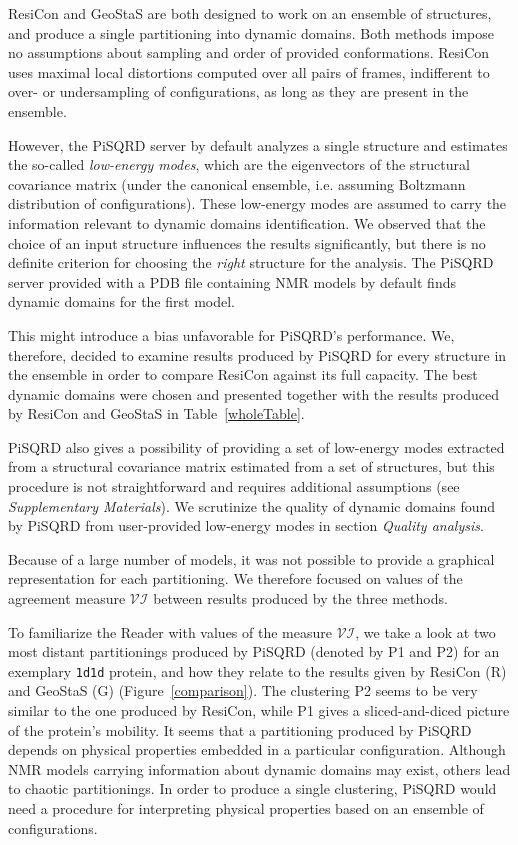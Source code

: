 \documentclass[a4paper,11pt,twoside]{book}%
\begin{document}
ResiCon and GeoStaS are both designed to work on an ensemble of structures, and produce a single partitioning into dynamic domains.
Both methods impose no assumptions about sampling and order of provided conformations.
ResiCon uses maximal local distortions computed over all pairs of frames, indifferent to over- or undersampling of configurations, as long as they are present in the ensemble.

However, the PiSQRD server by default analyzes a single structure and estimates the so-called \emph{low-energy modes}, which are the eigenvectors of the structural covariance matrix (under the canonical ensemble, i.e. assuming Boltzmann distribution of configurations).
These low-energy modes are assumed to carry the information relevant to dynamic domains identification.
We observed that the choice of an input structure influences the results significantly, but there is no definite criterion for choosing the \emph{right} structure for the analysis.
The PiSQRD server provided with a PDB file containing NMR models by default finds dynamic domains for the first model.

This might introduce a bias unfavorable for PiSQRD's performance. 
We, therefore, decided to examine results produced by PiSQRD for every structure in the ensemble in order to compare ResiCon against its full capacity.
The best dynamic domains were chosen and presented together with the results produced by ResiCon and GeoStaS in Table~\ref{wholeTable}.

PiSQRD also gives a possibility of providing a set of low-energy modes extracted from a structural covariance matrix estimated from a set of structures, but this procedure is not straightforward and requires additional assumptions (see \emph{Supplementary Materials}).
We scrutinize the quality of dynamic domains found by PiSQRD from user-provided low-energy modes in section \emph{Quality analysis}.

Because of a large number of models, it was not possible to provide a graphical representation for each partitioning.
We therefore focused on values of the agreement measure $\mathcal{VI}$ between results produced by the three methods.

To familiarize the Reader with values of the measure $\mathcal{VI}$, we take a look at two most distant partitionings produced by PiSQRD (denoted by P1 and P2) for an exemplary \texttt{1d1d} protein, and how they relate to the results given by ResiCon (R) and GeoStaS (G) (Figure~\ref{comparison}).
The clustering P2 seems to be very similar to the one produced by ResiCon, while P1 gives a sliced-and-diced picture of the protein's mobility.
It seems that a partitioning produced by PiSQRD depends on physical properties embedded in a particular configuration.
Although NMR models carrying information about dynamic domains may exist, others lead to chaotic partitionings.
In order to produce a single clustering, PiSQRD would need a procedure for interpreting physical properties based on an ensemble of configurations.
\end{document}
